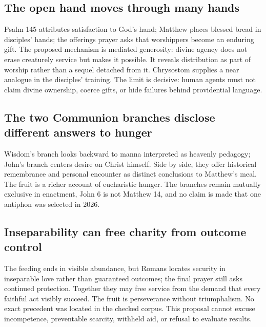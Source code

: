\subsection*{The open hand moves through many hands\enspace{}}
Psalm 145 attributes satisfaction to God's hand; Matthew places blessed bread in disciples' hands; the offerings prayer asks that worshippers become an enduring gift. The proposed mechanism is mediated generosity: divine agency does not erase creaturely service but makes it possible. It reveals distribution as part of worship rather than a sequel detached from it. Chrysostom supplies a near analogue in the disciples' training. The limit is decisive: human agents must not claim divine ownership, coerce gifts, or hide failures behind providential language.

\subsection*{The two Communion branches disclose different answers to hunger\enspace{}}
Wisdom's branch looks backward to manna interpreted as heavenly pedagogy; John's branch centers desire on Christ himself. Side by side, they offer historical remembrance and personal encounter as distinct conclusions to Matthew's meal. The fruit is a richer account of eucharistic hunger. The branches remain mutually exclusive in enactment, John 6 is not Matthew 14, and no claim is made that one antiphon was selected in 2026.

\subsection*{Inseparability can free charity from outcome control\enspace{}}
The feeding ends in visible abundance, but Romans locates security in inseparable love rather than guaranteed outcomes; the final prayer still asks continued protection. Together they may free service from the demand that every faithful act visibly succeed. The fruit is perseverance without triumphalism. No exact precedent was located in the checked corpus. This proposal cannot excuse incompetence, preventable scarcity, withheld aid, or refusal to evaluate results.

